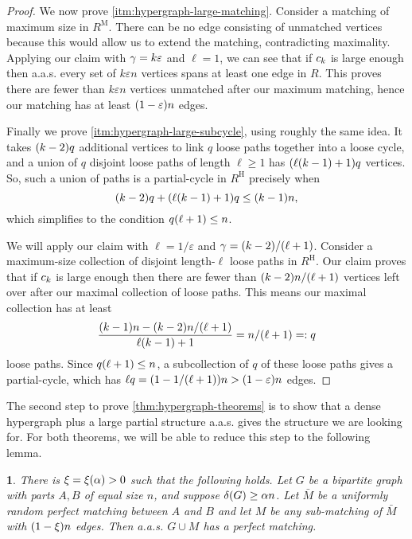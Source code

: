 \documentclass[11pt,english]{article}
\theoremstyle{plain}
\theoremstyle{definition}
\theoremstyle{definition}
\theoremstyle{plain}
\theoremstyle{plain}
\theoremstyle{plain}
\newtheorem{lem}[thm]{\protect\lemmaname}
\theoremstyle{plain}
\theoremstyle{remark}
\theoremstyle{remark}
\let\originalleft\left
\let\originalright\right
\renewcommand{\left}{\mathopen{}\mathclose\bgroup\originalleft}
\renewcommand{\right}{\aftergroup\egroup\originalright}
\providecommand{\lemmaname}{Lemma}
\begin{document}
\begin{proof}
We now prove \ref{itm:hypergraph-large-matching}. Consider a matching of maximum size in $R^{\mathrm{M}}$.
There can be no edge consisting of unmatched vertices because this would
allow us to extend the matching, contradicting maximality. Applying
our claim with $\gamma=k\varepsilon$ and $\ell=1$, we can see that
if $c_{k}$ is large enough then
a.a.s. every set of $k\varepsilon n$ vertices spans at least one
edge in $R$. This proves there are fewer than $k\varepsilon n$
vertices unmatched after our maximum matching, hence our matching
has at least $\left(1-\varepsilon\right)n$ edges.

Finally we prove \ref{itm:hypergraph-large-subcycle}, using roughly the same idea. It takes $\left(k-2\right)q$ additional
vertices to link $q$ loose paths together into a loose cycle, and
a union of $q$ disjoint loose paths of length $\ell\ge1$ has $\left(\ell\left(k-1\right)+1\right)q$
vertices. So, such a union of paths is a partial-cycle in $R^{\mathrm{H}}$
precisely when 
\[
\left(k-2\right)q+\left(\ell\left(k-1\right)+1\right)q\le\left(k-1\right)n,
\]
which simplifies to the condition $q\left(\ell+1\right) \leq n$.

We will apply our claim with $\ell=1/\varepsilon$ and $\patheps=\left(k-2\right)/\left(\ell+1\right)$. Consider a maximum-size collection of disjoint length-$\ell$ loose paths in $R^{\mathrm{H}}$. Our claim proves that if $c_{k}$ is large enough then there are fewer than $\left(k-2\right)n/\left(\ell+1\right)$ vertices left over after our maximal collection of loose paths. This means our maximal collection has at least
\[
\frac{\left(k-1\right)n-\left(k-2\right)n/\left(\ell+1\right)}{\ell\left(k-1\right)+1}= n/\left(\ell+1\right)=:q
\]
loose paths. Since $q\left(\ell+1\right) \leq n$, a subcollection of $q$ of these loose paths gives a partial-cycle, which has $\ell q=\left(1-1/\left(\ell+1\right)\right)n>\left(1-\varepsilon\right)n$ edges.
\end{proof}
The second step to prove \ref{thm:hypergraph-theorems} is to show that a dense
hypergraph plus a large partial structure a.a.s. gives the structure
we are looking for. For both theorems, we will be able to reduce this
step to the following lemma.
\begin{lem}
\label{lem:bipartite-plus-big-matching-perfect}There is $\xi=\xi\left(\alpha\right)>0$ 
such that the following holds. Let $G$ be a bipartite graph with
parts $A,B$ of equal size $n$, and suppose $\delta\left(G\right)\ge\alpha n$.
Let $\bar{M}$ be a uniformly random perfect matching between $A$
and $B$ and let $M$ be any sub-matching of $\bar{M}$ with $\left(1-\xi\right) n$
edges. Then a.a.s. $G\cup M$ has a perfect matching. 
\end{lem}
\end{document}
